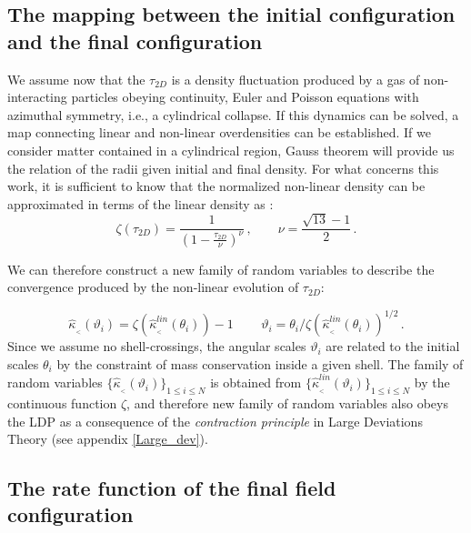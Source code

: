\documentclass[twocolumn,aps,reprint, nofootinbib]{revtex4}
\newcommand{\hkappa}{\hat{\kappa}_{_<}}
\newcommand{\fb}[1]{{\textcolor{red}{#1}}}
\begin{document}
\subsection{The mapping between the initial configuration and the final configuration}
\label{ldp_top_hat}
We assume now that the $\tau_{2D}$ is a density fluctuation produced by a gas of non-interacting particles obeying continuity, Euler and Poisson equations with azimuthal symmetry, i.e., a cylindrical collapse. If this dynamics can be solved, a map connecting linear and non-linear overdensities can be established. If we consider matter contained in a cylindrical region, Gauss theorem will provide us the relation of the radii given initial and final density. For what concerns this work, it is sufficient to know that the normalized non-linear density can be approximated in terms of the linear density as \cite{Bernardeau:1994hn}:
\begin{equation}
\label{zeta}
\zeta(\tau_{2D}) = \frac{1}{\left(1 - \frac{\tau_{2D}}{\nu} \right)^\nu} \, , \qquad \nu = \frac{\sqrt{13}-1}{2} \, .
\end{equation}

We can therefore construct a new family of random variables to describe the convergence produced by the non-linear evolution of $\tau_{2D}$:

\begin{equation}
\label{kappa_hat}
\hkappa(\vartheta_i) = \zeta( \hkappa^{lin}(\theta_i) ) -1 \, \qquad \vartheta_i = \theta_i/\zeta( \hkappa^{lin}(\theta_i) )^{1/2} \, .
\end{equation}
Since we assume no shell-crossings, the angular scales $\vartheta_i$ are related to the initial scales $\theta_i$ by the constraint of mass conservation inside a given shell. The family of random variables $\{ \hkappa(\vartheta_i) \}_{1 \leq i \leq N}$ is obtained from $\{ \hkappa^{lin}(\vartheta_i) \}_{1 \leq i \leq N}$ by the continuous function $\zeta$, and therefore new family of random variables also obeys the LDP as a consequence of the \emph{contraction principle} in Large Deviations Theory (see appendix \ref{Large_dev}). 

\subsection{The rate function of the final field configuration}
\end{document}
